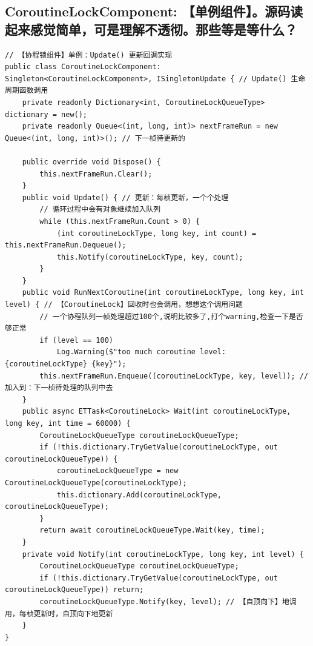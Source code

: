 \documentclass[9pt, b5paper]{article}
\begin{document}
\subsection{CoroutineLockComponent: 【单例组件】。源码读起来感觉简单，可是理解不透彻。那些等是等什么？}
\label{sec-14-6}
\begin{verbatim}
// 【协程锁组件】单例：Update() 更新回调实现
public class CoroutineLockComponent: Singleton<CoroutineLockComponent>, ISingletonUpdate { // Update() 生命周期函数调用 
    private readonly Dictionary<int, CoroutineLockQueueType> dictionary = new();
    private readonly Queue<(int, long, int)> nextFrameRun = new Queue<(int, long, int)>(); // 下一桢待更新的

    public override void Dispose() {
        this.nextFrameRun.Clear();
    }
    public void Update() { // 更新：每桢更新，一个个处理
        // 循环过程中会有对象继续加入队列
        while (this.nextFrameRun.Count > 0) {
            (int coroutineLockType, long key, int count) = this.nextFrameRun.Dequeue();
            this.Notify(coroutineLockType, key, count);
        }
    }
    public void RunNextCoroutine(int coroutineLockType, long key, int level) { // 【CoroutineLock】回收时也会调用，想想这个调用问题
        // 一个协程队列一帧处理超过100个,说明比较多了,打个warning,检查一下是否够正常
        if (level == 100) 
            Log.Warning($"too much coroutine level: {coroutineLockType} {key}");
        this.nextFrameRun.Enqueue((coroutineLockType, key, level)); // 加入到：下一桢待处理的队列中去
    }
    public async ETTask<CoroutineLock> Wait(int coroutineLockType, long key, int time = 60000) {
        CoroutineLockQueueType coroutineLockQueueType;
        if (!this.dictionary.TryGetValue(coroutineLockType, out coroutineLockQueueType)) {
            coroutineLockQueueType = new CoroutineLockQueueType(coroutineLockType);
            this.dictionary.Add(coroutineLockType, coroutineLockQueueType);
        }
        return await coroutineLockQueueType.Wait(key, time);
    }
    private void Notify(int coroutineLockType, long key, int level) {
        CoroutineLockQueueType coroutineLockQueueType;
        if (!this.dictionary.TryGetValue(coroutineLockType, out coroutineLockQueueType)) return;
        coroutineLockQueueType.Notify(key, level); // 【自顶向下】地调用，每桢更新时，自顶向下地更新
    }
}
\end{verbatim}
\end{document}
